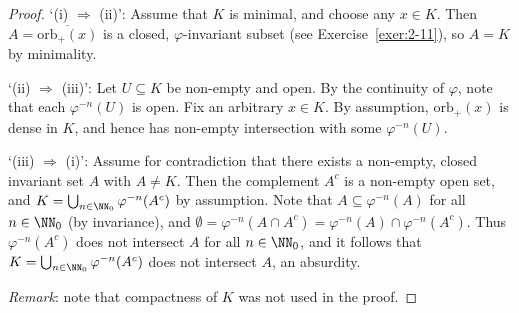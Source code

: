 \begin{proof}
	`(i) $\Rightarrow$ (ii)': Assume that $K$ is minimal, and choose any $x\in K$. Then $A = \overline{\mathrm{orb}_+(x)}$ is a closed, $\varphi$-invariant subset (see Exercise~\ref{exer:2-11}), so $A=K$ by minimality.
	
	`(ii) $\Rightarrow$ (iii)': Let $U \subseteq K$ be non-empty and open. By the continuity of $\varphi$, note that each $\varphi^{-n}(U)$ is open. Fix an arbitrary $x\in K$. By assumption, $\mathrm{orb}_+(x)$ is dense in $K$, and hence has non-empty intersection with some $\varphi^{-n}(U)$.
	
	`(iii) $\Rightarrow$ (i)': Assume for contradiction that there exists a non-empty, closed invariant set $A$ with $A \ne K$. Then the complement $A^c$ is a non-empty open set, and $K = \bigcup_{n\in\NN_0} \varphi^{-n}(A^c)$ by assumption. Note that $A \subseteq \varphi^{-n}(A)$ for all $n\in\NN_0$ (by invariance), and $\emptyset = \varphi^{-n}(A \cap A^c) = \varphi^{-n}(A) \cap \varphi^{-n}(A^c)$. Thus $\varphi^{-n}(A^c)$ does not intersect $A$ for all $n\in\NN_0$, and it follows that $K = \bigcup_{n\in\NN_0} \varphi^{-n}(A^c)$ does not intersect $A$, an absurdity.
	
	\emph{Remark}: note that compactness of $K$ was not used in the proof.
\end{proof}